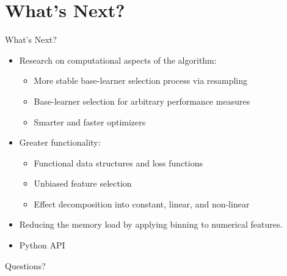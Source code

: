 \documentclass[10pt]{beamer}\usepackage[]{graphicx}\usepackage[]{color}
\begin{document}
\section{What's Next?}

\begin{frame}{What's Next?}

\begin{itemize}
  \item
    Research on computational aspects of the algorithm:
    \begin{itemize}
      \item
        More stable base-learner selection process via resampling
      \item
        Base-learner selection for arbitrary performance measures
      \item
        Smarter and faster optimizers
    \end{itemize}

  \item
    Greater functionality:
    \begin{itemize}
      \item
        Functional data structures and loss functions
      \item
        Unbiased feature selection
      \item
        Effect decomposition into constant, linear, and non-linear
    \end{itemize}

    \item
      Reducing the memory load by applying binning to numerical features.

    \item
      Python API
\end{itemize}

\end{frame}



\begin{frame}
  Questions?
\end{frame}
\end{document}
